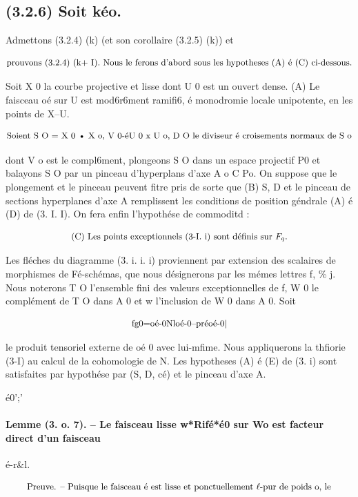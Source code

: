 \documentclass[11pt]{article}
\theoremstyle{remark}
\begin{document}
\subsection*{(3.2.6) Soit kéo.}

Admettons (3.2.4) (k) (et son corollaire (3.2.5) (k)) et

\[\text{\small prouvons (3.2.4) (k+ I). Nous le ferons d'abord sous les hypotheses (A) é (C) ci-dessous.}\]

Soit X 0 la courbe projective et lisse dont U 0 est un ouvert dense. (A) Le faisceau oé sur U est mod6r6ment ramifi6, é monodromie locale unipotente, en les points de X--U.

\[\text{\small Soient S O = X 0 • X o, V 0-éU 0 x U o, D O le diviseur é croisements normaux de S o}\]

dont V o est le compl6ment, plongeons S O dans un espace projectif P0 et balayons S O par un pinceau d'hyperplans d'axe A o C Po. On suppose que le plongement et le pinceau peuvent fitre pris de sorte que (B) S, D et le pinceau de sections hyperplanes d'axe A remplissent les conditions de position géndrale (A) é (D) de (3. I. I). On fera enfin l'hypothése de commoditd :

\[\text{\small (C) Les points exceptionnels (3-I. i) sont définis sur \(F_q\).}\]

Les fléches du diagramme (3. i. i. i) proviennent par extension des scalaires de morphismes de Fé-schémas, que nous désignerons par les mémes lettres f, \% j. Nous noterons T O l'ensemble fini des valeurs exceptionnelles de f, W 0 le complément de T O dans A 0 et w l'inclusion de W 0 dans A 0. Soit

\[\text{\small fg0=oé-0Nloé-0--préoé-0|}\]

le produit tensoriel externe de oé 0 avec lui-mfime. Nous appliquerons la thfiorie (3-I) au calcul de la cohomologie de N. Les hypotheses (A) é (E) de (3. i) sont satisfaites par hypothése par (S, D, cé) et le pinceau d'axe A.

é0';'

\paragraph{Lemme (3. o. 7). -- Le faisceau lisse w*Rifé*é0 sur Wo est facteur direct d'un faisceau}

é-r\&l.

\[\text{\small Preuve. -- Puisque le faisceau é est lisse et ponctuellement \(\ell\)-pur de poids o, le}\]
\end{document}
